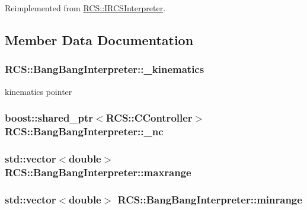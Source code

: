 Reimplemented from \hyperlink{classRCS_1_1IRCSInterpreter_a5181a696aed581ae842bfd31537cfc1f}{R\-C\-S\-::\-I\-R\-C\-S\-Interpreter}.



\subsection{Member Data Documentation}
\hypertarget{classRCS_1_1BangBangInterpreter_a3c3c12685416ba957ce2176c062890b4}{
\subsubsection[{\-\_\-kinematics}]{ R\-C\-S\-::\-Bang\-Bang\-Interpreter\-::\-\_\-kinematics\hspace{0.3cm}{\ttfamily [protected]}}}\label{classRCS_1_1BangBangInterpreter_a3c3c12685416ba957ce2176c062890b4}
kinematics pointer \hypertarget{classRCS_1_1BangBangInterpreter_a874d893a4134087ff5493758661599e2}{
\subsubsection[{\-\_\-nc}]{\setlength{\rightskip}{0pt plus 5cm}boost\-::shared\-\_\-ptr$<${\bf R\-C\-S\-::\-C\-Controller}$>$ R\-C\-S\-::\-Bang\-Bang\-Interpreter\-::\-\_\-nc\hspace{0.3cm}{\ttfamily [protected]}}}\label{classRCS_1_1BangBangInterpreter_a874d893a4134087ff5493758661599e2}
\hypertarget{classRCS_1_1BangBangInterpreter_a4e10b3c84dfeb87228da9eb62be855c0}{
\subsubsection[{maxrange}]{\setlength{\rightskip}{0pt plus 5cm}std\-::vector$<$double$>$ R\-C\-S\-::\-Bang\-Bang\-Interpreter\-::maxrange}}\label{classRCS_1_1BangBangInterpreter_a4e10b3c84dfeb87228da9eb62be855c0}
\hypertarget{classRCS_1_1BangBangInterpreter_a83562103bf03ffe4de00cd3a2f06c772}{
\subsubsection[{minrange}]{\setlength{\rightskip}{0pt plus 5cm}std\-::vector$<$double$>$ R\-C\-S\-::\-Bang\-Bang\-Interpreter\-::minrange}}\label{classRCS_1_1BangBangInterpreter_a83562103bf03ffe4de00cd3a2f06c772}


